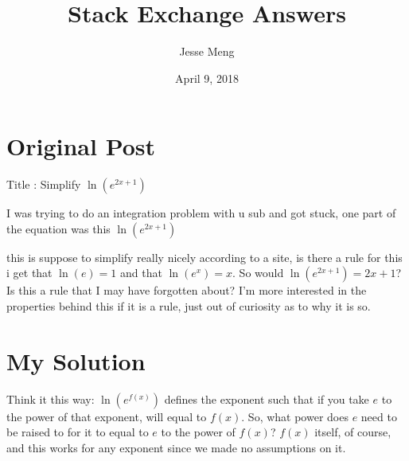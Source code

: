 \documentclass{article}
\title{Stack Exchange Answers}
\author{Jesse Meng }
\date{April 9, 2018}
\begin{document}
\maketitle

\section{Original Post}
Title : Simplify $\ln(e^{2x+1})$

I was trying to do an integration problem with u sub and got stuck, one part of the equation was this
$\ln(e^{2x+1})$

this is suppose to simplify really nicely according to a site, is there a rule for this i get that $\ln(e) =1$ and that $\ln(e^{x})=x$. So would $\ln(e^{2x+1})=2x+1$? Is this a rule that I may have forgotten about?
I'm more interested in the properties behind this if it is a rule, just out of curiosity as to why it is so.
\section{My Solution}
Think it this way: $\ln(e^{f(x)})$ defines the exponent such that if you take $e$ to the power of that exponent, will equal to $f(x)$. So, what power does $e$ need to be raised to for it to equal to $e$ to the power of $f(x)$? $f(x)$ itself, of course, and this works for any exponent since we made no assumptions on it.
\end{document}
